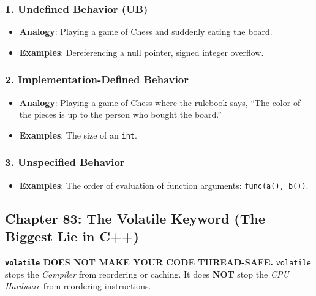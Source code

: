 \hypertarget{undefined-behavior-ub}{%
\subsubsection{1. Undefined Behavior (UB)}\label{undefined-behavior-ub}}

\begin{itemize}
\tightlist
\item
  \textbf{Analogy}: Playing a game of Chess and suddenly eating the
  board.
\item
  \textbf{Examples}: Dereferencing a null pointer, signed integer
  overflow.
\end{itemize}

\hypertarget{implementation-defined-behavior}{%
\subsubsection{2. Implementation-Defined
Behavior}\label{implementation-defined-behavior}}

\begin{itemize}
\tightlist
\item
  \textbf{Analogy}: Playing a game of Chess where the rulebook says,
  ``The color of the pieces is up to the person who bought the board.''
\item
  \textbf{Examples}: The size of an \passthrough{\lstinline!int!}.
\end{itemize}

\hypertarget{unspecified-behavior}{%
\subsubsection{3. Unspecified Behavior}\label{unspecified-behavior}}

\begin{itemize}
\tightlist
\item
  \textbf{Examples}: The order of evaluation of function arguments:
  \passthrough{\lstinline!func(a(), b())!}.
\end{itemize}

\hypertarget{chapter-83-the-volatile-keyword-the-biggest-lie-in-c}{%
\subsection{Chapter 83: The Volatile Keyword (The Biggest Lie in
C++)}\label{chapter-83-the-volatile-keyword-the-biggest-lie-in-c}}

\textbf{\passthrough{\lstinline!volatile!} DOES NOT MAKE YOUR CODE
THREAD-SAFE.} \passthrough{\lstinline!volatile!} stops the
\emph{Compiler} from reordering or caching. It does \textbf{NOT} stop
the \emph{CPU Hardware} from reordering instructions.

